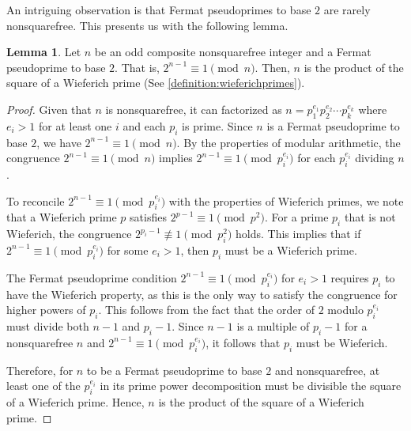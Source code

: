 \documentclass{article}
\theoremstyle{plain}
\theoremstyle{definition}
\newtheorem{lemma}{Lemma}
\begin{document}
An intriguing observation is that Fermat pseudoprimes to base $2$ are rarely nonsquarefree. This presents us with the following lemma.

\begin{lemma}
Let $n$ be an odd composite nonsquarefree integer and a Fermat pseudoprime to base $2$. That is, $2^{n-1} \equiv 1 \pmod{n}$. Then, $n$ is the product of the square of a Wieferich prime (See \cref{definition:wieferichprimes}).
\end{lemma}
\begin{proof}
Given that $n$ is nonsquarefree, it can factorized as $n = p_1^{e_1} p_2^{e_2} \cdots p_k^{e_k}$ where $e_i > 1$ for at least one $i$ and each $p_i$ is prime. Since $n$ is a Fermat pseudoprime to base $2$, we have $2^{n-1} \equiv 1 \pmod{n}$. By the properties of modular arithmetic, the congruence $2^{n-1} \equiv 1 \pmod{n}$ implies $2^{n-1} \equiv 1 \pmod{p_i^{e_i}}$ for each $p_i^{e_i}$ dividing $n$.

To reconcile $2^{n-1} \equiv 1 \pmod{p_i^{e_i}}$ with the properties of Wieferich primes, we note that a Wieferich prime $p$ satisfies $2^{p-1} \equiv 1 \pmod{p^2}$. For a prime $p_i$ that is not Wieferich, the congruence $2^{p_i-1} \not\equiv 1 \pmod{p_i^2}$ holds. This implies that if $2^{n-1} \equiv 1 \pmod{p_i^{e_i}}$ for some $e_i > 1$, then $p_i$ must be a Wieferich prime.

The Fermat pseudoprime condition $2^{n-1} \equiv 1 \pmod{p_i^{e_i}}$ for $e_i > 1$ requires $p_i$ to have the Wieferich property, as this is the only way to satisfy the congruence for higher powers of $p_i$. This follows from the fact that the order of $2$ modulo $p_i^{e_i}$ must divide both $n-1$ and $p_i-1$. Since $n-1$ is a multiple of $p_i-1$ for a nonsquarefree $n$ and $2^{n-1} \equiv 1 \pmod{p_i^{e_i}}$, it follows that $p_i$ must be Wieferich.

Therefore, for $n$ to be a Fermat pseudoprime to base $2$ and nonsquarefree, at least one of the $p_i^{e_i}$ in its prime power decomposition must be divisible the square of a Wieferich prime. Hence, $n$ is the product of the square of a Wieferich prime.
\end{proof}
\end{document}
